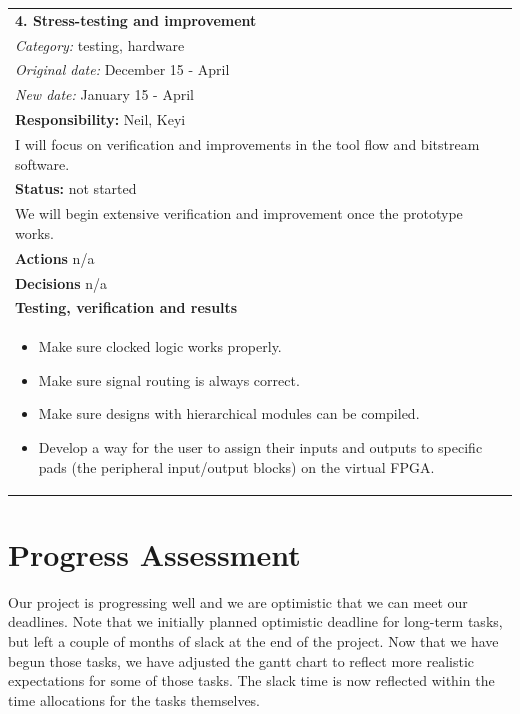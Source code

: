 \documentclass[12pt,letterpaper]{article}
\begin{document}
\begin{tabular}{|p{6.4in}|}
\hline
\textbf{4. Stress-testing and improvement} \\
\emph{Category:} testing, hardware \\
\emph{Original date:} December 15 - April \\
\emph{New date:} January 15 - April \\
\hline
\textbf{Responsibility:} Neil, Keyi \\
I will focus on verification and improvements in the tool flow and bitstream software. \\
\hline
\textbf{Status:} not started \\
We will begin extensive verification and improvement once the prototype works. \\
\hline
\textbf{Actions} n/a \\
\hline
\textbf{Decisions} n/a \\
\hline
\textbf{Testing, verification and results} \\
\vspace{-1em}
\begin{itemize}
\item Make sure clocked logic works properly.
\item Make sure signal routing is always correct.
\item Make sure designs with hierarchical modules can be compiled.
\item Develop a way for the user to assign their inputs and outputs to specific pads (the peripheral input/output blocks) on the virtual FPGA.
\end{itemize} 
\vspace{-1em} \\
\hline
\end{tabular}





\section{Progress Assessment}

Our project is progressing well and we are optimistic that we can meet our deadlines.
Note that we initially planned optimistic deadline for long-term tasks, but left a couple of months of slack at the end of the project.
Now that we have begun those tasks, we have adjusted the gantt chart to reflect more realistic expectations for some of those tasks.
The slack time is now reflected within the time allocations for the tasks themselves.
\end{document}
